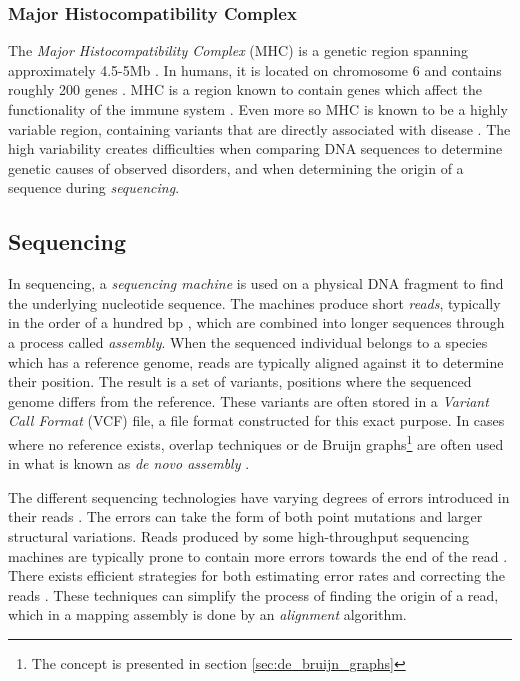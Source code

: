 \documentclass[thesis.tex]{subfiles}
\begin{document}
\subsubsection{Major Histocompatibility Complex}
\label{sec:mhc}
The \textit{Major Histocompatibility Complex} (MHC) is a genetic region spanning approximately 4.5-5Mb \cite{improved_genome_inference_in_the_mhc_using_a_population_reference_graph}\cite{canonical_stable_general_mapping_using_context_schemes}. In humans, it is located on chromosome 6 and contains roughly 200 genes \cite{retroelements_in_mhc}. MHC is a region known to contain genes which affect the functionality of the immune system \cite{the_importance_of_immune_gene_variability_in_evolutionary_ecology_and_conservation}. Even more so MHC is known to be a highly variable region, containing variants that are directly associated with disease \cite{variation_analysis_and_gene_annotation_of_eight_mhc_haplotypes}. The high variability creates difficulties when comparing DNA sequences to determine genetic causes of observed disorders, and when determining the origin of a sequence during \textit{sequencing}.
\subsection{Sequencing}
\label{sec:sequencing}
In sequencing, a \textit{sequencing machine} is used on a physical DNA fragment to find the underlying nucleotide sequence. The machines produce short \textit{reads}, typically in the order of a hundred bp \cite{sequencing_platforms}, which are combined into longer sequences through a process called \textit{assembly}. When the sequenced individual belongs to a species which has a reference genome, reads are typically aligned against it to determine their position. The result is a set of variants, positions where the sequenced genome differs from the reference. These variants are often stored in a \textit{Variant Call Format} (VCF) file, a file format constructed for this exact purpose. In cases where no reference exists, overlap techniques \cite{an_eulerian_path_approach_to_dna_fragment_assembly} or de Bruijn graphs\footnote{The concept is presented in section \ref{sec:de_bruijn_graphs}} are often used in what is known as \textit{de novo assembly} \cite[Chapter 1, p. 19]{introduction_to_genomics}.\\
\par\noindent
The different sequencing technologies have varying degrees of errors introduced in their reads \cite{sequencing_platforms}. The errors can take the form of both point mutations and larger structural variations. Reads produced by some high-throughput sequencing machines are typically prone to contain more errors towards the end of the read \cite{errors_start_end}. There exists efficient strategies for both estimating error rates \cite{estimation_of_sequencing_error_rates_in_short_reads} and correcting the reads \cite{error_correction_of_datasets_with_non_uniform_coverage}. These techniques can simplify the process of finding the origin of a read, which in a mapping assembly is done by an \textit{alignment} algorithm.
\end{document}
